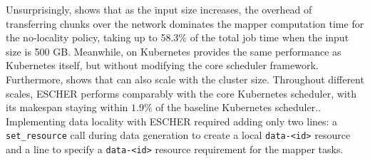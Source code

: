 
Unsurprisingly,  shows that as the input size increases, 
the overhead of transferring chunks over the network dominates the mapper computation time for the no-locality policy, taking up to 58.3\% of the total job time when the input size is 500 GB.
Meanwhile, \name{} on Kubernetes provides the same performance as Kubernetes itself, but without modifying the core scheduler framework.
Furthermore,  shows that \name{} can also scale with the cluster size. 
Throughout different scales, ESCHER performs comparably with the core Kubernetes scheduler, with its makespan staying within $1.9\%$ of the baseline Kubernetes scheduler.. Implementing data locality with ESCHER required adding only two lines:  a \lstinline{set_resource} call during data generation to create a local \lstinline{data-<id>} resource and a line to specify a \lstinline{data-<id>} resource requirement for the mapper tasks.


